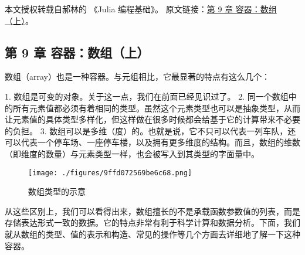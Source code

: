 
本文授权转载自郝林的 《Julia 编程基础》。 原文链接：\href{https://github.com/hyper0x/JuliaBasics/blob/master/book/ch09.md}{第 9 章 容器：数组（上）}。


\subsection{第 9 章 容器：数组（上）}

数组（array）也是一种容器。与元组相比，它最显著的特点有这么几个：

1. 数组是可变的对象。关于这一点，我们在前面已经见识过了。
2. 同一个数组中的所有元素值都必须有着相同的类型。虽然这个元素类型也可以是抽象类型，从而让元素值的具体类型多样化，但这样做在很多时候都会给基于它的计算带来不必要的负担。
3. 数组可以是多维（度）的。也就是说，它不只可以代表一列车队，还可以代表一个停车场、一座停车楼，以及拥有更多维度的结构。而且，数组的维数（即维度的数量）与元素类型一样，也会被写入到其类型的字面量中。

\begin{figure}[ht]
\centering
\texttt{[image: ./figures/9ffd072569be6c68.png]}
\caption{数组类型的示意} \label{fig_JuC9S0_1}
\end{figure}

从这些区别上，我们可以看得出来，数组擅长的不是承载函数参数值的列表，而是存储表达形式一致的数据。它的特点非常有利于科学计算和数据分析。下面，我们就从数组的类型、值的表示和构造、常见的操作等几个方面去详细地了解一下这种容器。
